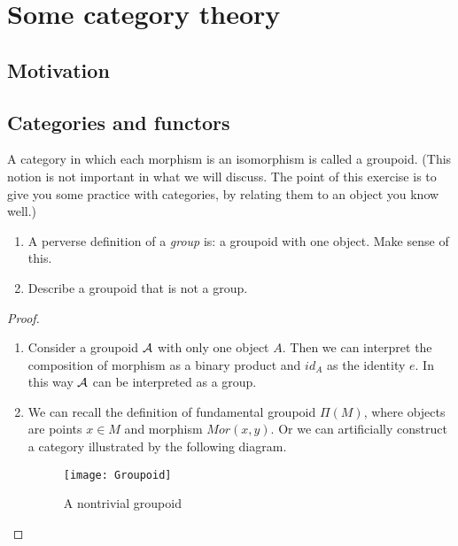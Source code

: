 \chapter{Some category theory}

\section{Motivation}

\section{Categories and functors}
\begin{exr}
A category in which each morphism is an isomorphism is called a groupoid. (This notion is not important in what we will discuss. The point of this exercise is to give you some practice with categories, by relating them to an object you know well.)
\begin{enumerate}[label=(\alph*)]
\item A perverse definition of a \textit{group} is: a groupoid with one object. Make sense of this.
\item Describe a groupoid that is not a group.
\end{enumerate}
\end{exr}
\begin{proof}\ 
\begin{enumerate}[label=(\alph*)]
\item Consider a groupoid ${\cal A}$ with only one object $A$. Then we can interpret the composition of morphism as a binary product and $id_A$ as the identity $e$. In this way ${\cal A}$ can be interpreted as a group.
\item We can recall the definition of fundamental groupoid $\Pi(M)$, where objects are points $x\in M$ and morphism $Mor(x,y)$. Or we can artificially construct a category illustrated by the following diagram.
\begin{figure}[h]
\centering\texttt{[image: Groupoid]}
\caption{A nontrivial groupoid}
\end{figure}
\end{enumerate}
\end{proof}

